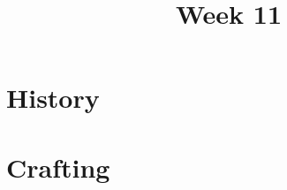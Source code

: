 \documentclass[11pt]{article}
\title{Week 11}
\date{}
\begin{document}
    \maketitle

    \section*{History}
        \begin{itemize}
        \end{itemize}

    \section*{Crafting}
        \begin{itemize}
        \end{itemize}
\end{document}
